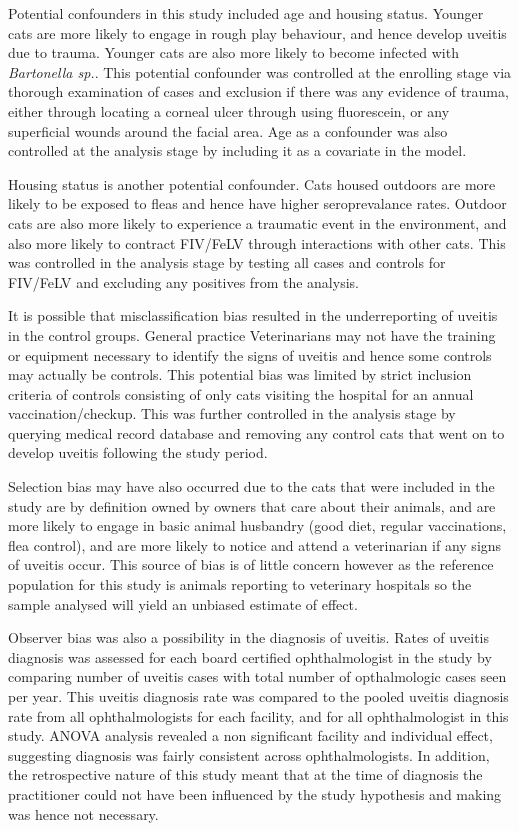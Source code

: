 \documentclass[11pt,twocolumn]{article}
\begin{document}
		Potential confounders in this study included age and housing status. 
		Younger cats are more likely to engage in rough play behaviour, and hence develop uveitis due to trauma. Younger cats are also more likely to become infected with \emph{Bartonella sp.}.
		This potential confounder was controlled at the enrolling stage via thorough examination of cases and exclusion if there was any evidence of trauma, either through locating a corneal ulcer through using fluorescein, or any superficial wounds around the facial area.
		Age as a confounder was also controlled at the analysis stage by including it as a covariate in the model.

		
		Housing status is another potential confounder. Cats housed outdoors are more likely to be exposed to fleas and hence have higher seroprevalance rates.
		Outdoor cats are also more likely to experience a traumatic event in the environment, and also more likely to contract FIV/FeLV through interactions with other cats.
		This was controlled in the analysis stage by testing all cases and controls for FIV/FeLV and excluding any positives from the analysis.


		It is possible that misclassification bias resulted in the underreporting of uveitis in the control groups. General practice Veterinarians may not have the training or equipment necessary to identify the signs of uveitis and hence some controls may actually be controls.
		This potential bias was limited by strict inclusion criteria of controls consisting of only cats visiting the hospital for an annual vaccination/checkup. 
		This was further controlled in the analysis stage by querying medical record database and removing any control cats that went on to develop uveitis following the study period.


		Selection bias may have also occurred due to the cats that were included in the study are by definition owned by owners that care about their animals, and are more likely to engage in basic animal husbandry (good diet, regular vaccinations, flea control), and are more likely to notice and attend a veterinarian if any signs of uveitis occur.  
		This source of bias is of little concern however as the reference population for this study is animals reporting to veterinary hospitals so the sample analysed will yield an unbiased estimate of effect.


		Observer bias was also a possibility in the diagnosis of uveitis.
		Rates of uveitis diagnosis was assessed for each board certified ophthalmologist in the study by comparing number of uveitis cases with total number of opthalmologic cases seen per year. This uveitis diagnosis rate was compared to the pooled uveitis diagnosis rate from all ophthalmologists for each facility, and for all ophthalmologist in this study.
		ANOVA analysis revealed a non significant facility and individual effect, suggesting diagnosis was fairly consistent across ophthalmologists.
		In addition, the retrospective nature of this study meant that at the time of diagnosis the practitioner could not have been influenced by the study hypothesis and making was hence not necessary. 
\end{document}

